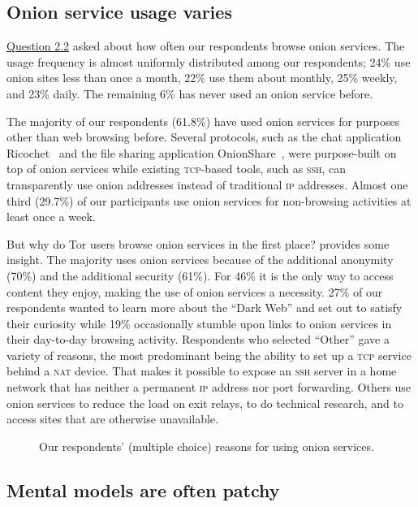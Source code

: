 \subsection{Onion service usage varies}

\hyperref[q2_2]{Question 2.2} asked about how often our respondents browse onion
services.  The usage frequency is almost uniformly distributed among our
respondents; 24\% use onion sites less than once a month, 22\% use them about
monthly, 25\% weekly, and 23\% daily.  The remaining 6\% has never used an onion
service before.

The majority of our respondents (61.8\%) have used onion services for purposes
other than web browsing before.  Several protocols, such as the chat application
Ricochet~\cite{ricochet} and the file sharing application
OnionShare~\cite{onionshare}, were purpose-built on top of onion services while
existing \textsc{tcp}-based tools, such as \textsc{ssh}, can transparently use
onion addresses instead of traditional \textsc{ip} addresses.  Almost one third
(29.7\%) of our participants use onion services for non-browsing activities at
least once a week.

But why do Tor users browse onion services in the first place?
 provides some insight.  The majority uses onion services
because of the additional anonymity (70\%) and the additional security (61\%).
For 46\% it is the only way to access content they enjoy, making the use of
onion services a necessity.  27\% of our respondents wanted to learn more about
the ``Dark Web'' and set out to satisfy their curiosity while 19\% occasionally
stumble upon links to onion services in their day-to-day browsing activity.
Respondents who selected ``Other'' gave a variety of reasons, the most
predominant being the ability to set up a \textsc{tcp} service behind a
\textsc{nat} device.  That makes it possible to expose an \textsc{ssh} server in
a home network that has neither a permanent \textsc{ip} address nor port
forwarding.  Others use onion services to reduce the load on exit relays, to do
technical research, and to access sites that are otherwise unavailable.

\begin{figure}[t]
    \centering
    
    \caption{Our respondents' (multiple choice) reasons for using onion
    services.}
    \label{fig:onion-usage}
\end{figure}

\subsection{Mental models are often patchy}
\label{sec:mental-models}

